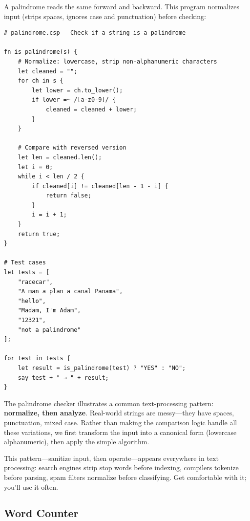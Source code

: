 A palindrome reads the same forward and backward. This program normalizes input (strips spaces, ignores case and punctuation) before checking:

\begin{tcolorbox}[colback=codebg, colframe=darkpurple, colbacktitle=darkpurple, title=\textbf{\textcolor{codegold}{Palindrome Checker (palindrome.csp)}}, fonttitle=\bfseries, sharp corners]
\begin{lstlisting}
# palindrome.csp — Check if a string is a palindrome

fn is_palindrome(s) {
    # Normalize: lowercase, strip non-alphanumeric characters
    let cleaned = "";
    for ch in s {
        let lower = ch.to_lower();
        if lower =~ /[a-z0-9]/ {
            cleaned = cleaned + lower;
        }
    }

    # Compare with reversed version
    let len = cleaned.len();
    let i = 0;
    while i < len / 2 {
        if cleaned[i] != cleaned[len - 1 - i] {
            return false;
        }
        i = i + 1;
    }
    return true;
}

# Test cases
let tests = [
    "racecar",
    "A man a plan a canal Panama",
    "hello",
    "Madam, I'm Adam",
    "12321",
    "not a palindrome"
];

for test in tests {
    let result = is_palindrome(test) ? "YES" : "NO";
    say test + " → " + result;
}
\end{lstlisting}
\end{tcolorbox}

\begin{tcolorbox}[colback=lightlavender, colframe=softvioletdark, title=\textbf{\textcolor{darkpurple}{Thinking in CRISP: String Normalization}}, fonttitle=\bfseries, sharp corners]
The palindrome checker illustrates a common text-processing pattern: \textbf{normalize, then analyze}. Real-world strings are messy—they have spaces, punctuation, mixed case. Rather than making the comparison logic handle all these variations, we first transform the input into a canonical form (lowercase alphanumeric), then apply the simple algorithm.

This pattern—sanitize input, then operate—appears everywhere in text processing: search engines strip stop words before indexing, compilers tokenize before parsing, spam filters normalize before classifying. Get comfortable with it; you'll use it often.
\end{tcolorbox}

\subsection{Word Counter}

